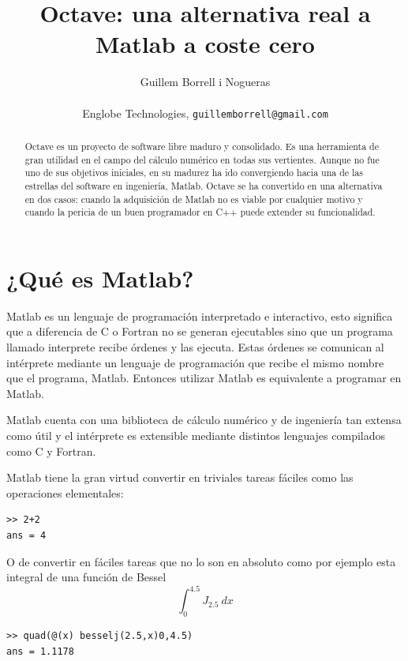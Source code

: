 \documentclass[10pt,letterpaper,conference]{ieeeconfspanish}
\title{\LARGE \bf Octave: una alternativa real a Matlab a coste cero}
\author{\parbox{7in}{\centering Guillem Borrell i Nogueras\\%
\mbox{}\\
Englobe Technologies,
        {\tt\small guillemborrell@gmail.com}\\%
}
}
\begin{document}
\maketitle


\thispagestyle{empty}
\pagestyle{empty}


\begin{abstract}
Octave es un proyecto de software libre maduro y consolidado. Es una
herramienta de gran utilidad en el campo del cálculo numérico en todas
sus vertientes.  Aunque no fue uno de sus objetivos iniciales, en su
madurez ha ido convergiendo hacia una de las estrellas del software en
ingeniería, Matlab. Octave se ha convertido en una alternativa en dos
casos: cuando la adquisición de Matlab no es viable por cualquier
motivo y cuando la pericia de un buen programador en C++ puede
extender su funcionalidad.
\end{abstract}


\hypertarget{qu-es-matlab}{}

\section*{¿Qué es Matlab?}

Matlab es un lenguaje de programación interpretado e interactivo, esto
significa que a diferencia de C o Fortran no se generan ejecutables
sino que un programa llamado interprete recibe órdenes y las ejecuta.
Estas órdenes se comunican al intérprete mediante un lenguaje de
programación que recibe el mismo nombre que el programa, Matlab.
Entonces utilizar Matlab es equivalente a programar en Matlab.

Matlab cuenta con una biblioteca de cálculo numérico y de ingeniería
tan extensa como útil y el intérprete es extensible mediante distintos
lenguajes compilados como C y Fortran.

Matlab tiene la gran virtud convertir en triviales tareas fáciles como
las operaciones elementales:
\begin{verbatim}
>> 2+2
ans = 4
\end{verbatim}

O de convertir en fáciles tareas que no lo son en absoluto como por
ejemplo esta integral de una función de Bessel
\[ \int_0 ^{4.5} J_{2.5}\ dx \]

\begin{verbatim}
>> quad(@(x) besselj(2.5,x)0,4.5)
ans = 1.1178
\end{verbatim}
\end{document}
